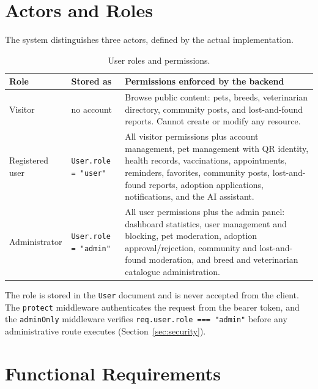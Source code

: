 
\section{Actors and Roles}

The system distinguishes three actors, defined by the actual implementation.

\begin{table}[htbp]
\centering
\begin{tabular}{@{}p{2.5cm}p{3.2cm}p{8.6cm}@{}}
\toprule
\textbf{Role} & \textbf{Stored as} & \textbf{Permissions enforced by the backend} \\
\midrule
Visitor & no account & Browse public content: pets, breeds, veterinarian
directory, community posts, and lost-and-found reports. Cannot create or modify
any resource. \\
\addlinespace
Registered user & \texttt{User.role = "user"} & All visitor permissions plus
account management, pet management with QR identity, health records,
vaccinations, appointments, reminders, favorites, community posts, lost-and-found
reports, adoption applications, notifications, and the AI assistant. \\
\addlinespace
Administrator & \texttt{User.role = "admin"} & All user permissions plus the
admin panel: dashboard statistics, user management and blocking, pet moderation,
adoption approval/rejection, community and lost-and-found moderation, and breed
and veterinarian catalogue administration. \\
\bottomrule
\end{tabular}
\caption{User roles and permissions.}
\label{tab:roles}
\end{table}

The role is stored in the \texttt{User} document and is never accepted from the
client. The \texttt{protect} middleware authenticates the request from the bearer
token, and the \texttt{adminOnly} middleware verifies
\texttt{req.user.role === "admin"} before any administrative route executes
(Section~\ref{sec:security}).

\section{Functional Requirements}

